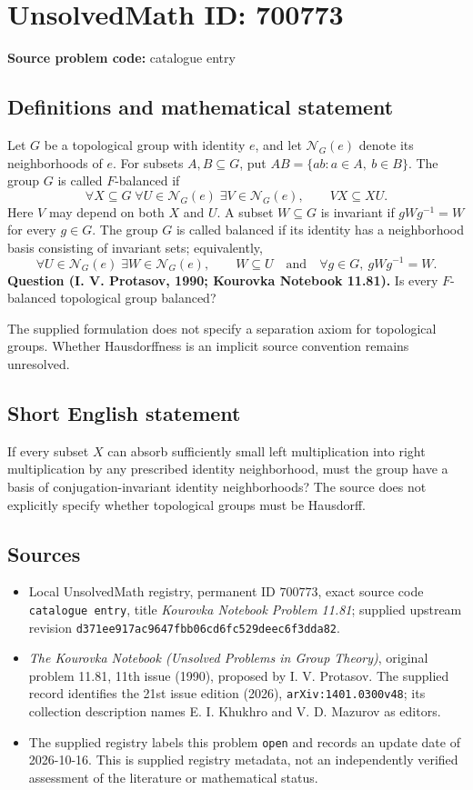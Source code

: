 \documentclass[11pt]{article}
\begin{document}
\section*{UnsolvedMath ID: 700773}
\textbf{Source problem code:} catalogue entry
\subsection{Definitions and mathematical statement}
Let \(G\) be a topological group with identity \(e\), and let \(\mathcal N_G(e)\) denote its neighborhoods of \(e\). For subsets \(A,B\subseteq G\), put \(AB=\{ab:a\in A,\ b\in B\}\). The group \(G\) is called \(F\)-balanced if
\[
\forall X\subseteq G\;\forall U\in\mathcal N_G(e)\;\exists V\in\mathcal N_G(e),\qquad VX\subseteq XU.
\]
Here \(V\) may depend on both \(X\) and \(U\). A subset \(W\subseteq G\) is invariant if \(gWg^{-1}=W\) for every \(g\in G\). The group \(G\) is called balanced if its identity has a neighborhood basis consisting of invariant sets; equivalently,
\[
\forall U\in\mathcal N_G(e)\;\exists W\in\mathcal N_G(e),\qquad W\subseteq U\quad\text{and}\quad \forall g\in G,\ gWg^{-1}=W.
\]
\textbf{Question (I. V. Protasov, 1990; Kourovka Notebook 11.81).} Is every \(F\)-balanced topological group balanced?

The supplied formulation does not specify a separation axiom for topological groups. Whether Hausdorffness is an implicit source convention remains unresolved.
\subsection{Short English statement}
If every subset \(X\) can absorb sufficiently small left multiplication into right multiplication by any prescribed identity neighborhood, must the group have a basis of conjugation-invariant identity neighborhoods? The source does not explicitly specify whether topological groups must be Hausdorff.
\subsection{Sources}
\begin{itemize}
\item Local UnsolvedMath registry, permanent ID \(700773\), exact source code \texttt{catalogue entry}, title \emph{Kourovka Notebook Problem 11.81}; supplied upstream revision \texttt{d371ee917ac9647fbb06cd6fc529deec6f3dda82}.
\item \emph{The Kourovka Notebook (Unsolved Problems in Group Theory)}, original problem 11.81, 11th issue (1990), proposed by I. V. Protasov. The supplied record identifies the 21st issue edition (2026), \texttt{arXiv:1401.0300v48}; its collection description names E. I. Khukhro and V. D. Mazurov as editors.
\item The supplied registry labels this problem \texttt{open} and records an update date of 2026-10-16. This is supplied registry metadata, not an independently verified assessment of the literature or mathematical status.
\end{itemize}
\end{document}
